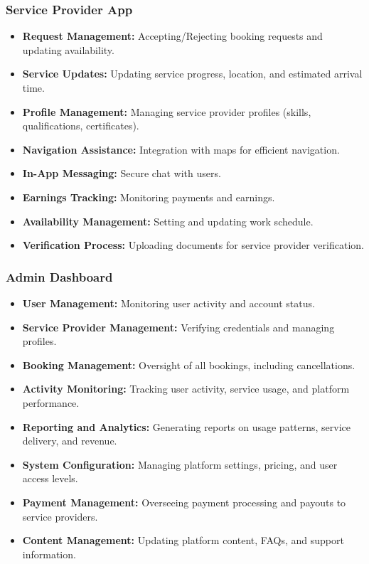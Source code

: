 \documentclass[12pt]{article}
\begin{document}
\subsubsection{Service Provider App}

\begin{itemize}
    \item \textbf{Request Management:} Accepting/Rejecting booking requests and updating availability.
    \item \textbf{Service Updates:} Updating service progress, location, and estimated arrival time.
    \item \textbf{Profile Management:} Managing service provider profiles (skills, qualifications, certificates).
    \item \textbf{Navigation Assistance:} Integration with maps for efficient navigation.
    \item \textbf{In-App Messaging:} Secure chat with users.
    \item \textbf{Earnings Tracking:} Monitoring payments and earnings.
    \item \textbf{Availability Management:} Setting and updating work schedule.
    \item \textbf{Verification Process:} Uploading documents for service provider verification.
\end{itemize}

\subsubsection{Admin Dashboard}
\begin{itemize}
    \item \textbf{User Management:} Monitoring user activity and account status.
    \item \textbf{Service Provider Management:} Verifying credentials and managing profiles.
    \item \textbf{Booking Management:} Oversight of all bookings, including cancellations.
    \item \textbf{Activity Monitoring:} Tracking user activity, service usage, and platform performance.
   \item \textbf{Reporting and Analytics:} Generating reports on usage patterns, service delivery, and revenue.
    \item \textbf{System Configuration:} Managing platform settings, pricing, and user access levels.
    \item \textbf{Payment Management:} Overseeing payment processing and payouts to service providers.
    \item \textbf{Content Management:} Updating platform content, FAQs, and support information.
\end{itemize}
\end{document}
